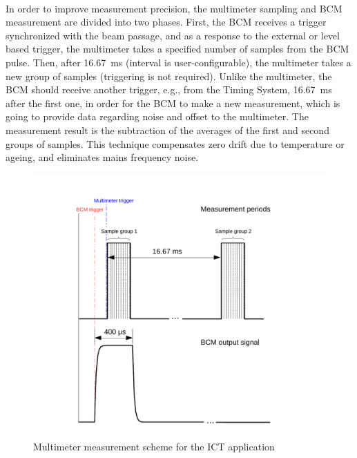 \documentclass[openany]{article}
\begin{document}
	\paragraph{} In order to improve measurement precision, the multimeter sampling and BCM measurement are divided into two phases. First, the BCM receives a trigger synchronized with the beam passage, and as a response to the external or level based trigger, the multimeter takes a specified number of samples from the BCM pulse. Then, after \SI{16.67}{\milli\second} (interval is user-configurable), the multimeter takes a new group of samples (triggering is not required). Unlike the multimeter, the BCM should receive another trigger, e.g., from the Timing System, \SI{16.67}{\milli\second} after the first one, in order for the BCM to make a new measurement, which is going to provide data regarding noise and offset to the multimeter. The measurement result is the subtraction of the averages of the first and second groups of samples. This technique compensates zero drift due to temperature or ageing, and eliminates mains frequency noise.

	\begin{figure}[!h]
		\caption{Multimeter measurement scheme for the ICT application}
		\label{fig:meas-scheme}
		\centering
		\includegraphics[width=1.0\textwidth]{ict-meas-scheme-image}
	\end{figure}
\FloatBarrier
\end{document}

